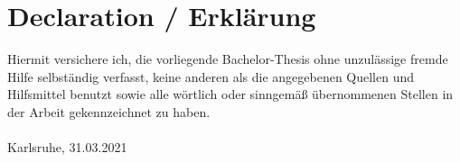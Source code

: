 
\chapter*{Declaration / Erkl\"arung}
Hiermit versichere ich, die vorliegende Bachelor-Thesis ohne unzulässige fremde Hilfe selbständig verfasst, keine anderen als die angegebenen Quellen und Hilfsmittel benutzt sowie alle wörtlich oder sinngemäß übernommenen Stellen in der Arbeit gekennzeichnet zu haben.\\

\vspace{2cm}
\myname \\
Karlsruhe, 31.03.2021\\
